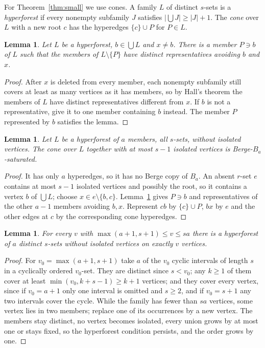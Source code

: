 \documentclass[11pt]{article}
\newtheorem{lemma}[theorem]{Lemma}
\theoremstyle{definition}
\theoremstyle{remark}
\begin{document}
For Theorem~\ref{thm:small} we use cones. A family $L$ of distinct
$s$-sets is a \emph{hyperforest} if every nonempty subfamily $J$ satisfies
$|\bigcup J|\ge|J|+1$. The \emph{cone} over $L$ with a new root $c$ has the
hyperedges $\{c\}\cup P$ for $P\in L$.

\begin{lemma}\label{lem:rep}
Let $L$ be a hyperforest, $b\in\bigcup L$ and $x\ne b$. There is a member
$P\ni b$ of $L$ such that the members of $L\setminus\{P\}$ have distinct
representatives avoiding $b$ and $x$.
\end{lemma}

\begin{proof}
After $x$ is deleted from every member, each nonempty subfamily still covers
at least as many vertices as it has members, so by Hall's theorem the
members of $L$ have distinct representatives different from $x$. If $b$ is
not a representative, give it to one member containing $b$ instead. The
member $P$ represented by $b$ satisfies the lemma.
\end{proof}

\begin{lemma}\label{lem:cone}
Let $L$ be a hyperforest of $a$ members, all $s$-sets, without isolated
vertices. The cone over $L$ together with at most $s-1$ isolated vertices is
Berge-$B_a$-saturated.
\end{lemma}

\begin{proof}
It has only $a$ hyperedges, so it has no Berge copy of $B_a$. An absent
$r$-set $e$ contains at most $s-1$ isolated vertices and possibly the root,
so it contains a vertex $b$ of $\bigcup L$; choose $x\in e\setminus\{b,c\}$.
Lemma~\ref{lem:rep} gives $P\ni b$ and representatives of the other $a-1$
members avoiding $b,x$. Represent $cb$ by $\{c\}\cup P$, $bx$ by $e$ and the
other edges at $c$ by the corresponding cone hyperedges.
\end{proof}

\begin{lemma}\label{lem:orders}
For every $v$ with $\max(a+1,s+1)\le v\le sa$ there is a hyperforest of $a$
distinct $s$-sets without isolated vertices on exactly $v$ vertices.
\end{lemma}

\begin{proof}
For $v_0=\max(a+1,s+1)$ take $a$ of the $v_0$ cyclic intervals of length $s$
in a cyclically ordered $v_0$-set. They are distinct since $s<v_0$; any
$k\ge1$ of them cover at least $\min(v_0,k+s-1)\ge k+1$ vertices; and they
cover every vertex, since if $v_0=a+1$ only one interval is omitted and
$s\ge2$, and if $v_0=s+1$ any two intervals cover the cycle. While the
family has fewer than $sa$ vertices, some vertex lies in two members;
replace one of its occurrences by a new vertex. The members stay distinct,
no vertex becomes isolated, every union grows by at most one or stays
fixed, so the hyperforest condition persists, and the order grows by one.
\end{proof}
\end{document}
